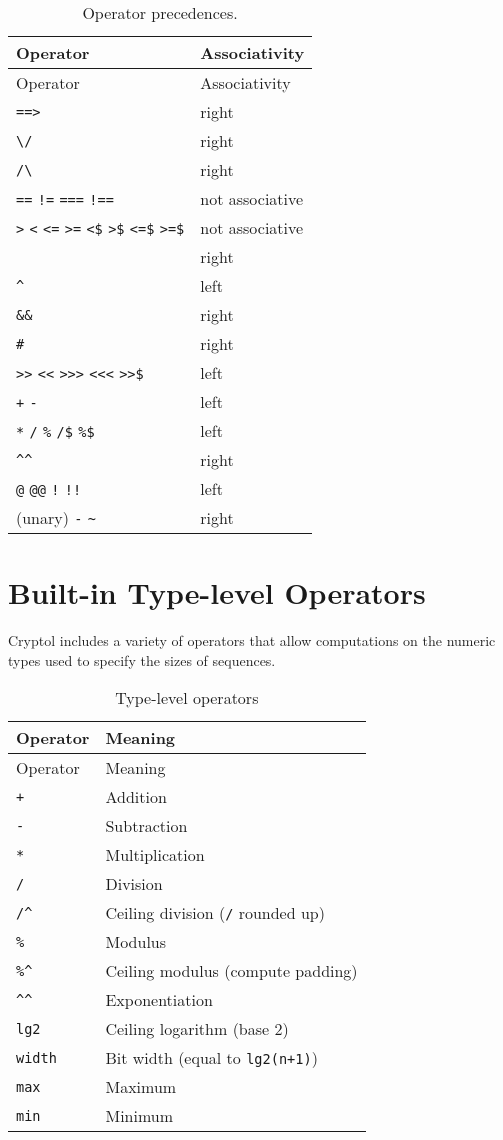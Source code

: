 \begin{longtable}[]{@{}ll@{}}
\caption{Operator precedences.}\tabularnewline
\toprule
Operator & Associativity\tabularnewline
\midrule
\endfirsthead
\toprule
Operator & Associativity\tabularnewline
\midrule
\endhead
\texttt{==\textgreater{}} & right\tabularnewline
\texttt{\textbackslash{}/} & right\tabularnewline
\texttt{/\textbackslash{}} & right\tabularnewline
\texttt{==} \texttt{!=} \texttt{===} \texttt{!==} & not
associative\tabularnewline
\texttt{\textgreater{}} \texttt{\textless{}} \texttt{\textless{}=}
\texttt{\textgreater{}=} \texttt{\textless{}\$}
\texttt{\textgreater{}\$} \texttt{\textless{}=\$}
\texttt{\textgreater{}=\$} & not associative\tabularnewline
\texttt{\textbar{}\textbar{}} & right\tabularnewline
\texttt{\^{}} & left\tabularnewline
\texttt{\&\&} & right\tabularnewline
\texttt{\#} & right\tabularnewline
\texttt{\textgreater{}\textgreater{}} \texttt{\textless{}\textless{}}
\texttt{\textgreater{}\textgreater{}\textgreater{}}
\texttt{\textless{}\textless{}\textless{}}
\texttt{\textgreater{}\textgreater{}\$} & left\tabularnewline
\texttt{+} \texttt{-} & left\tabularnewline
\texttt{*} \texttt{/} \texttt{\%} \texttt{/\$} \texttt{\%\$} &
left\tabularnewline
\texttt{\^{}\^{}} & right\tabularnewline
\texttt{@} \texttt{@@} \texttt{!} \texttt{!!} & left\tabularnewline
(unary) \texttt{-} \texttt{\textasciitilde{}} & right\tabularnewline
\bottomrule
\end{longtable}

\section{Built-in Type-level
Operators}\label{built-in-type-level-operators}

Cryptol includes a variety of operators that allow computations on the
numeric types used to specify the sizes of sequences.

\begin{longtable}[]{@{}ll@{}}
\caption{Type-level operators}\tabularnewline
\toprule
Operator & Meaning\tabularnewline
\midrule
\endfirsthead
\toprule
Operator & Meaning\tabularnewline
\midrule
\endhead
\texttt{+} & Addition\tabularnewline
\texttt{-} & Subtraction\tabularnewline
\texttt{*} & Multiplication\tabularnewline
\texttt{/} & Division\tabularnewline
\texttt{/\^{}} & Ceiling division (\texttt{/} rounded up)\tabularnewline
\texttt{\%} & Modulus\tabularnewline
\texttt{\%\^{}} & Ceiling modulus (compute padding)\tabularnewline
\texttt{\^{}\^{}} & Exponentiation\tabularnewline
\texttt{lg2} & Ceiling logarithm (base 2)\tabularnewline
\texttt{width} & Bit width (equal to \texttt{lg2(n+1)})\tabularnewline
\texttt{max} & Maximum\tabularnewline
\texttt{min} & Minimum\tabularnewline
\bottomrule
\end{longtable}

